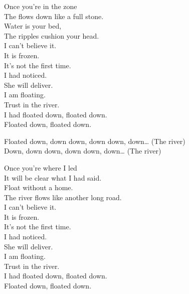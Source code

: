 
\label{album:quarters}





Once you're in the zone \\
The  flows down like a full stone. \\
Water is your bed, \\
The ripples cushion your head. \\

I can't believe it. \\
It is frozen. \\
It's not the first time. \\
I had noticed. \\
She will deliver. \\
I am floating. \\
Trust in the river. \\
I had floated down, floated down. \\
Floated down, floated down. \\


Floated down, down down, down down, down… (The river) \\
Down, down down, down down, down… (The river) \\


Once you're where I led \\
It will be clear what I had said. \\
Float without a home. \\
The river flows like another long road. \\

I can't believe it. \\
It is frozen. \\
It's not the first time. \\
I had noticed. \\
She will deliver. \\
I am floating. \\
Trust in the river. \\
I had floated down, floated down. \\
Floated down, floated down. \\

